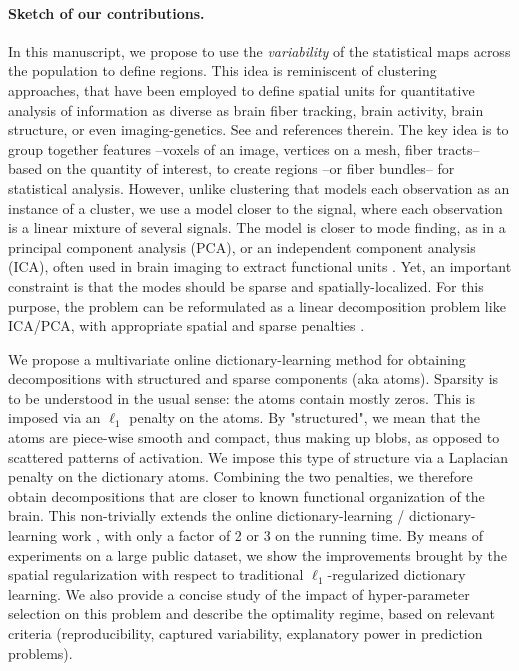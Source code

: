 \paragraph*{Sketch of our contributions.}
In this manuscript, we propose to use the \textit{variability} of the statistical
maps across the population to define regions.
%
This idea is reminiscent of
clustering approaches, that have been employed to define spatial units
for quantitative analysis of information as diverse as brain fiber
tracking, brain activity, brain structure, or even imaging-genetics. See  \cite{Varol2014,hibar2013genetic} and references therein.
%
The key idea is to group together features --voxels of an image,
vertices on a mesh, fiber tracts-- based on the quantity of interest, to
create regions --or fiber bundles-- for statistical analysis. However,
unlike clustering that models each observation as an instance of a
cluster, we use a model closer to the signal, where each observation is a
linear mixture of several signals. The model is closer to mode finding,
as in a principal component analysis (PCA), or an independent component
analysis (ICA), often used in brain imaging to extract functional units
 \cite{beckmann2004}. Yet, an important constraint is that the modes
 should be sparse and spatially-localized. For this purpose, the problem can be reformulated as a linear decomposition problem like ICA/PCA, with
 appropriate spatial and sparse penalties  \cite{varoquaux2011,abraham2013}. 

We propose a multivariate online dictionary-learning method for obtaining
decompositions with structured and sparse components (aka atoms).
Sparsity is to be understood in the usual sense: the atoms contain mostly
zeros. This is imposed via an $\ell_1$ penalty on the atoms. 
%
By "structured", we mean that the atoms are piece-wise smooth and
compact, thus making up blobs, as opposed to scattered patterns of
activation. We impose this type of structure via a Laplacian penalty on the
dictionary atoms. Combining the two penalties, we therefore
obtain decompositions that are closer to known functional organization of the brain. This non-trivially extends the online dictionary-learning /
dictionary-learning work  \cite{mairal2010}, with only a factor of 2
or 3 on the running time.
%
By means of experiments on a large public dataset, we show the
improvements brought by the spatial regularization with respect to
traditional $\ell_1$-regularized dictionary learning.
%
We also provide a concise study of the impact of
hyper-parameter selection on this problem and describe the optimality
regime, based on relevant criteria (reproducibility, captured
variability, explanatory power in prediction problems).

